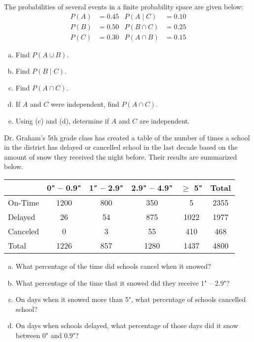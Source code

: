 \documentclass[11pt,letterpaper]{article}
\begin{document}

 The probabilities of several events in a finite probability space are given below:
	\[
	\begin{aligned}
	P(A)&= 0.45 & P(A \;|\; C)&= 0.10 \\
	P(B)&= 0.50 & P(B \cap C)&= 0.25 \\
	P(C)&= 0.30 & P(A \cap B)&= 0.15
	\end{aligned}
	\] 
\begin{enumerate}[(a)]
\item Find $P(A \cup B)$.
\item Find $P(B \;|\; C)$.
\item Find $P(A \cap C)$.
\item If $A$ and $C$ were independent, find $P(A \cap C)$.
\item Using (c) and (d), determine if $A$ and $C$ are independent. 
\end{enumerate}



\newpage



 Dr. Graham's 5th grade class has created a table of the number of times a school in the district has delayed or cancelled school in the last decade based on the amount of snow they received the night before. Their results are summarized below.
	\begin{table}[!ht]
	\centering
	\begin{tabular}{|l||c|c|c|c||c|} \hline
	& 0" -- 0.9" & 1" -- 2.9" & 2.9" -- 4.9" & $\geq$ 5" & Total \\ \hline \hline
	On-Time & 1200 & 800 & 350 & 5  & 2355 \\ \hline
	Delayed & 26 & 54 & 875 & 1022 & 1977 \\ \hline
	Canceled & 0 & 3 & 55 & 410 & 468 \\ \hline \hline
	Total & 1226 & 857 & 1280 & 1437 & 4800 \\ \hline
	\end{tabular}
	\end{table}

\begin{enumerate}[(a)]
\item What percentage of the time did schools cancel when it snowed?
\item What percentage of the time that it snowed did they receive 1" -- 2.9"?
\item On days when it snowed more than 5", what percentage of schools cancelled school?
\item On days when schools delayed, what percentage of those days did it snow between 0" and 0.9"?
\end{enumerate}
\end{document}
